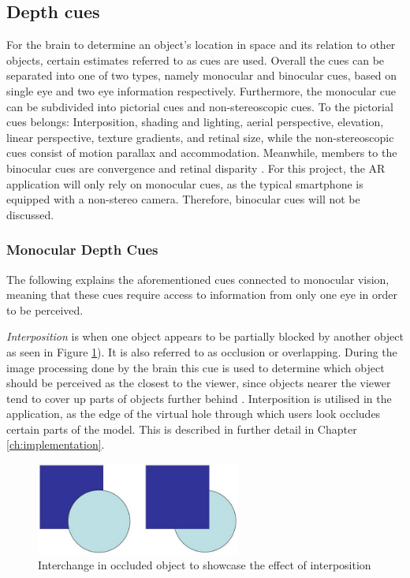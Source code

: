 \subsection{Depth cues}
For the brain to determine an object’s location in space and its relation to other objects, certain estimates referred to as cues are used. Overall the cues can be separated into one of two types, namely monocular and binocular cues, based on single eye and two eye information respectively. Furthermore, the monocular cue can be subdivided into pictorial cues and non-stereoscopic cues. To the pictorial cues belongs: Interposition, shading and lighting, aerial perspective, elevation, linear perspective, texture gradients, and retinal size, while the non-stereoscopic cues consist of motion parallax and accommodation. Meanwhile, members to the binocular cues are convergence and retinal disparity \cite{Gale}. For this project, the AR application will only rely on monocular cues, as the typical smartphone is equipped with a non-stereo camera. Therefore, binocular cues will not be discussed. 

\subsubsection{Monocular Depth Cues}
The following explains the aforementioned cues connected to monocular vision, meaning that these cues require access to information from only one eye in order to be perceived.

\textit{Interposition} is when one object appears to be partially blocked by another object as seen in Figure \ref{fig:cue0}). It is also referred to as occlusion or overlapping. During the image processing done by the brain this cue is used to determine which object should be perceived as the closest to the viewer, since objects nearer the viewer tend to cover up parts of objects further behind \cite{Gale}. Interposition is utilised in the application, as the edge of the virtual hole through which users look occludes certain parts of the model. This is described in further detail in Chapter \ref{ch:implementation}.

\begin{figure}[h!]
   \centering
   \includegraphics[width=0.6\textwidth]{figures/cue0.jpg}
   \caption{Interchange in occluded object to showcase the effect of interposition \cite{Heeger}}\label{fig:cue0}
\end{figure}

